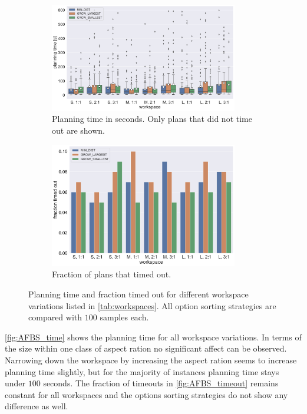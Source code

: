\begin{figure}
	\centering
	\begin{subfigure}[b]{\textwidth}
		\centering
		\includegraphics[width=0.9\textwidth]{figures/plots/AFBS_time.pdf}
		\caption{Planning time in seconds. Only plans that did not time out are shown.}
		\label{fig:AFBS_time}
	\end{subfigure}
	
	\begin{subfigure}[b]{\textwidth}
		\centering
		\includegraphics[width=0.9\textwidth]{figures/plots/AFBS_timeout.pdf}
		\caption{Fraction of plans that timed out.}
		\label{fig:AFBS_timeout}
	\end{subfigure}
	\caption[Planning time and fraction timed out for different workspace variations]{Planning time and fraction timed out for different workspace variations listed in \autoref{tab:workspaces}. All option sorting strategies are compared with $100$ samples each.}
	\label{fig:AFBS_timestats}
\end{figure}

\autoref{fig:AFBS_time} shows the planning time for all workspace variations.
In terms of the size within one class of aspect ration no significant affect can be observed.
Narrowing down the workspace by increasing the aspect ration seems to increase planning time slightly, but for the majority of instances planning time stays under $100$ seconds.
The fraction of timeouts in \autoref{fig:AFBS_timeout} remains constant for all workspaces and the options sorting strategies do not show any difference as well.


